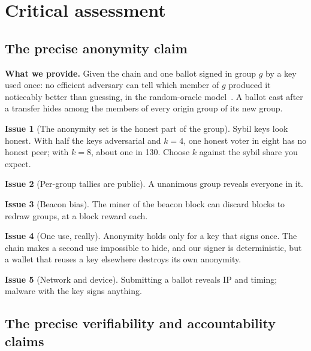 \documentclass[11pt,a4paper]{article}
\theoremstyle{definition}
\newtheorem{flaw}{Issue}
\begin{document}
\section{Critical assessment}
\label{sec:assessment}

\subsection{The precise anonymity claim}

\textbf{What we provide.} Given the chain and one ballot signed in group
$g$ by a key used once: no efficient adversary can tell which member of $g$
produced it noticeably better than guessing, in the random-oracle
model~\cite{SZ21}. A ballot cast after a transfer hides among the members
of every origin group of its new group.

\begin{flaw}[The anonymity set is the honest part of the group]
Sybil keys look honest. With half the keys adversarial and $k = 4$, one
honest voter in eight has no honest peer; with $k = 8$, about one in 130.
Choose $k$ against the sybil share you expect.
\end{flaw}

\begin{flaw}[Per-group tallies are public]
A unanimous group reveals everyone in it.
\end{flaw}

\begin{flaw}[Beacon bias]
The miner of the beacon block can discard blocks to redraw groups, at a
block reward each.
\end{flaw}

\begin{flaw}[One use, really]
Anonymity holds only for a key that signs once. The chain makes a second
use impossible to hide, and our signer is deterministic, but a wallet that
reuses a key elsewhere destroys its own anonymity.
\end{flaw}

\begin{flaw}[Network and device]
Submitting a ballot reveals IP and timing; malware with the key signs
anything.
\end{flaw}

\subsection{The precise verifiability and accountability claims}
\end{document}
